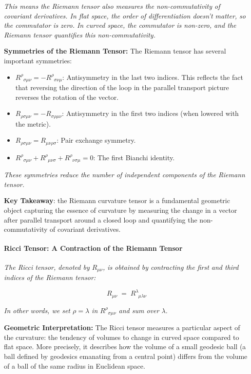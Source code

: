 \textit{This means the Riemann tensor also measures the non-commutativity of covariant derivatives. In flat space, the order of differentiation doesn't matter, so the commutator is zero. In curved space, the commutator is non-zero, and the Riemann tensor quantifies this non-commutativity.}

\textbf{Symmetries of the Riemann Tensor:} The Riemann tensor has several important symmetries:
\begin{itemize}
    \item \(R^\rho_{\;\;\sigma\mu\nu} = -R^\rho_{\;\;\sigma\nu\mu}\): Antisymmetry in the last two indices. This reflects the fact that reversing the direction of the loop in the parallel transport picture reverses the rotation of the vector.
    \item \(R_{\rho\sigma\mu\nu} = -R_{\sigma\rho\mu\nu}\): Antisymmetry in the first two indices (when lowered with the metric).
    \item \(R_{\rho\sigma\mu\nu} = R_{\mu\nu\rho\sigma}\): Pair exchange symmetry.
    \item \(R^\rho_{\;\;\sigma\mu\nu} + R^\rho_{\;\;\mu\nu\sigma} + R^\rho_{\;\;\nu\sigma\mu} = 0\): The first Bianchi identity.
\end{itemize}

\textit{These symmetries reduce the number of independent components of the Riemann tensor.}

\textbf{Key Takeaway}: the Riemann curvature tensor is a fundamental geometric object capturing the essence of curvature by measuring the change in a vector after parallel transport around a closed loop and quantifying the non-commutativity of covariant derivatives.

\paragraph{Ricci Tensor: A Contraction of the Riemann Tensor}

\textit{The Ricci tensor, denoted by \(R_{\mu\nu}\), is obtained by contracting the first and third indices of the Riemann tensor:}

\[
R_{\mu\nu} \;=\; R^\lambda_{\;\;\mu\lambda\nu}
\]

\textit{In other words, we set \(\rho = \lambda\) in \(R^\rho_{\;\;\sigma\mu\nu}\) and sum over \(\lambda\).}

\textbf{Geometric Interpretation:} The Ricci tensor measures a particular aspect of the curvature: the tendency of volumes to change in curved space compared to flat space. More precisely, it describes how the volume of a small geodesic ball (a ball defined by geodesics emanating from a central point) differs from the volume of a ball of the same radius in Euclidean space.

